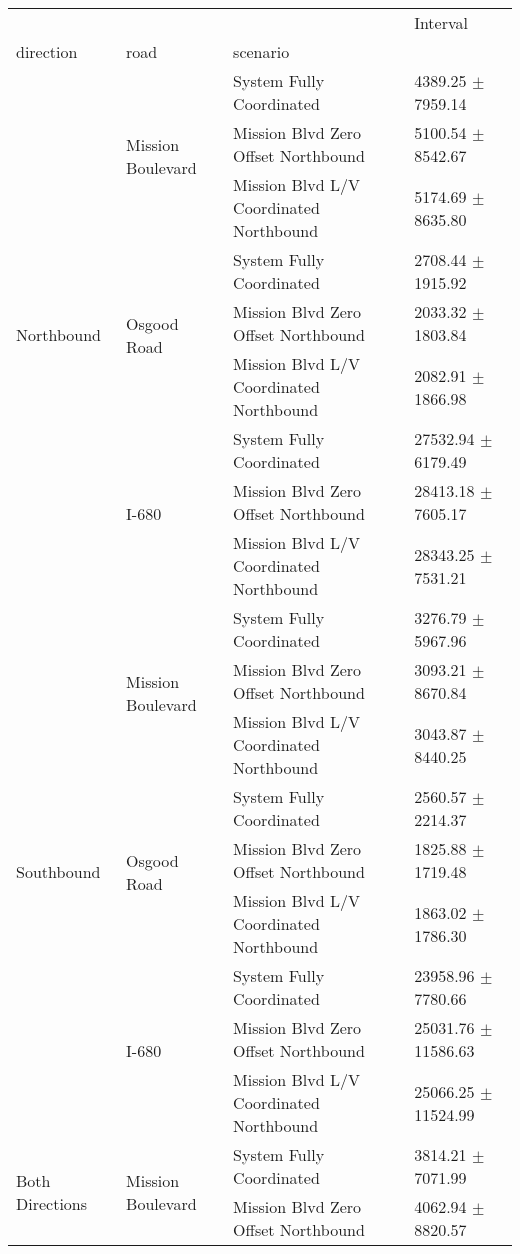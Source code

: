 \begin{tabular}{llll}
\toprule
 &  &  & Interval \\
direction & road & scenario &  \\
\midrule
\multirow[t]{9}{*}{Northbound} & \multirow[t]{3}{*}{Mission Boulevard} & System Fully Coordinated & 4389.25 $\pm$ 7959.14 \\
 &  & Mission Blvd Zero Offset Northbound & 5100.54 $\pm$ 8542.67 \\
 &  & Mission Blvd L/V Coordinated Northbound & 5174.69 $\pm$ 8635.80 \\
 & \multirow[t]{3}{*}{Osgood Road} & System Fully Coordinated & 2708.44 $\pm$ 1915.92 \\
 &  & Mission Blvd Zero Offset Northbound & 2033.32 $\pm$ 1803.84 \\
 &  & Mission Blvd L/V Coordinated Northbound & 2082.91 $\pm$ 1866.98 \\
 & \multirow[t]{3}{*}{I-680} & System Fully Coordinated & 27532.94 $\pm$ 6179.49 \\
 &  & Mission Blvd Zero Offset Northbound & 28413.18 $\pm$ 7605.17 \\
 &  & Mission Blvd L/V Coordinated Northbound & 28343.25 $\pm$ 7531.21 \\
\multirow[t]{9}{*}{Southbound} & \multirow[t]{3}{*}{Mission Boulevard} & System Fully Coordinated & 3276.79 $\pm$ 5967.96 \\
 &  & Mission Blvd Zero Offset Northbound & 3093.21 $\pm$ 8670.84 \\
 &  & Mission Blvd L/V Coordinated Northbound & 3043.87 $\pm$ 8440.25 \\
 & \multirow[t]{3}{*}{Osgood Road} & System Fully Coordinated & 2560.57 $\pm$ 2214.37 \\
 &  & Mission Blvd Zero Offset Northbound & 1825.88 $\pm$ 1719.48 \\
 &  & Mission Blvd L/V Coordinated Northbound & 1863.02 $\pm$ 1786.30 \\
 & \multirow[t]{3}{*}{I-680} & System Fully Coordinated & 23958.96 $\pm$ 7780.66 \\
 &  & Mission Blvd Zero Offset Northbound & 25031.76 $\pm$ 11586.63 \\
 &  & Mission Blvd L/V Coordinated Northbound & 25066.25 $\pm$ 11524.99 \\
\multirow[t]{9}{*}{Both Directions} & \multirow[t]{3}{*}{Mission Boulevard} & System Fully Coordinated & 3814.21 $\pm$ 7071.99 \\
 &  & Mission Blvd Zero Offset Northbound & 4062.94 $\pm$ 8820.57 \\

\end{tabular}
